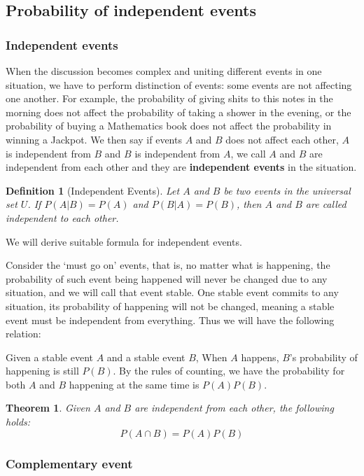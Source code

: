 \documentclass[12pt]{article}
\newtheorem{definition}{Definition}[section]
\newtheorem*{theorem}{Theorem}
\begin{document}
    \subsection{Probability of independent events}

    \subsubsection*{Independent events}

    When the discussion becomes complex and uniting different events in one situation, we have to perform distinction of events: some events are not affecting one another. For example, the probability of giving shits to this notes in the morning does not affect the probability of taking a shower in the evening, or the probability of buying a Mathematics book does not affect the probability in winning a Jackpot. We then say if events $A$ and $B$ does not affect each other, $A$ is independent from $B$ and $B$ is independent from $A$, we call $A$ and $B$ are independent from each other and they are \textbf{independent events} in the situation.

    \begin{definition}[Independent Events]
        Let $A$ and $B$ be two events in the universal set $U$. If $P(A|B)=P(A)$ and $P(B|A)=P(B)$, then $A$ and $B$ are called independent to each other.
    \end{definition}

    We will derive suitable formula for independent events.

    Consider the `must go on' events, that is, no matter what is happening, the probability of such event being happened will never be changed due to any situation, and we will call that event stable. One stable event commits to any situation, its probability of happening will not be changed, meaning a stable event must be independent from everything. Thus we will have the following relation:

    Given a stable event $A$ and a stable event $B$, When $A$ happens, $B$'s probability of happening is still $P(B)$. By the rules of counting, we have the probability for both $A$ and $B$ happening at the same time is $P(A)P(B)$.

    \begin{theorem}
        Given $A$ and $B$ are independent from each other, the following holds:\[P(A\cap B)=P(A)P(B)\]
    \end{theorem}

    \subsubsection*{Complementary event}
\end{document}
